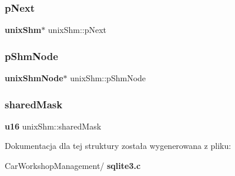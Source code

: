 \mbox{\label{structunix_shm_a0d5229cf734581f51cdf16dd7d5ce93a}} 
\subsubsection{pNext}
{\footnotesize\ttfamily \textbf{ unix\+Shm}$\ast$ unix\+Shm\+::p\+Next}

\mbox{\label{structunix_shm_a8ab421232d29e3237262ef46775199ee}} 
\subsubsection{pShmNode}
{\footnotesize\ttfamily \textbf{ unix\+Shm\+Node}$\ast$ unix\+Shm\+::p\+Shm\+Node}

\mbox{\label{structunix_shm_a768aa62a6ea2bd91ab60a34d7654811b}} 
\subsubsection{sharedMask}
{\footnotesize\ttfamily \textbf{ u16} unix\+Shm\+::shared\+Mask}



Dokumentacja dla tej struktury została wygenerowana z pliku\+:\begin{DoxyCompactItemize}
\item 
Car\+Workshop\+Management/\textbf{ sqlite3.\+c}\end{DoxyCompactItemize}
